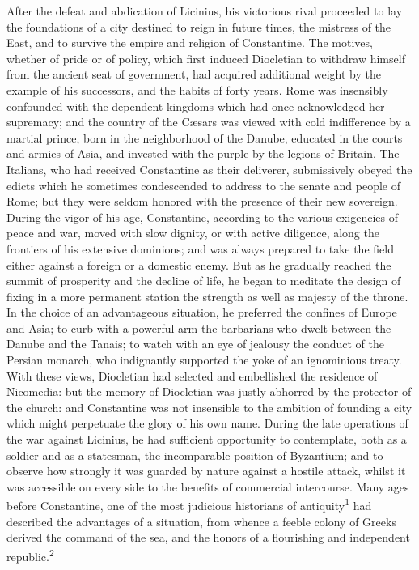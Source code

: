After the defeat and abdication of Licinius, his victorious rival
proceeded to lay the foundations of a city destined to reign in
future times, the mistress of the East, and to survive the empire
and religion of Constantine. The motives, whether of pride or of
policy, which first induced Diocletian to withdraw himself from
the ancient seat of government, had acquired additional weight by
the example of his successors, and the habits of forty years.
Rome was insensibly confounded with the dependent kingdoms which
had once acknowledged her supremacy; and the country of the
Cæsars was viewed with cold indifference by a martial prince,
born in the neighborhood of the Danube, educated in the courts
and armies of Asia, and invested with the purple by the legions
of Britain. The Italians, who had received Constantine as their
deliverer, submissively obeyed the edicts which he sometimes
condescended to address to the senate and people of Rome; but
they were seldom honored with the presence of their new
sovereign. During the vigor of his age, Constantine, according to
the various exigencies of peace and war, moved with slow dignity,
or with active diligence, along the frontiers of his extensive
dominions; and was always prepared to take the field either
against a foreign or a domestic enemy. But as he gradually
reached the summit of prosperity and the decline of life, he
began to meditate the design of fixing in a more permanent
station the strength as well as majesty of the throne. In the
choice of an advantageous situation, he preferred the confines of
Europe and Asia; to curb with a powerful arm the barbarians who
dwelt between the Danube and the Tanais; to watch with an eye of
jealousy the conduct of the Persian monarch, who indignantly
supported the yoke of an ignominious treaty. With these views,
Diocletian had selected and embellished the residence of
Nicomedia: but the memory of Diocletian was justly abhorred by
the protector of the church: and Constantine was not insensible
to the ambition of founding a city which might perpetuate the
glory of his own name. During the late operations of the war
against Licinius, he had sufficient opportunity to contemplate,
both as a soldier and as a statesman, the incomparable position
of Byzantium; and to observe how strongly it was guarded by
nature against a hostile attack, whilst it was accessible on
every side to the benefits of commercial intercourse. Many ages
before Constantine, one of the most judicious historians of
antiquity\textsuperscript{1} had described the advantages of a situation, from
whence a feeble colony of Greeks derived the command of the sea,
and the honors of a flourishing and independent republic.\textsuperscript{2}


